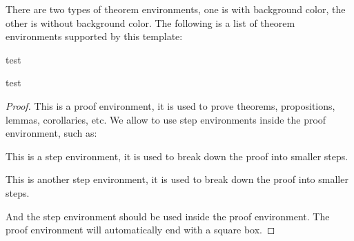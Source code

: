     There are two types of theorem environments, one is with background color, the other is without background color. 
    The following is a list of theorem environments supported by this template:

    \begin{definition}
        test    
    \end{definition}
    \begin{proposition}
        test 
    \end{proposition}
    \begin{proof}
        This is a proof environment, it is used to prove theorems, propositions, lemmas, corollaries, etc.
        We allow to use step environments inside the proof environment, such as:
        \begin{step}\label{step:1_in_proof_1}
            This is a step environment, it is used to break down the proof into smaller steps.
        \end{step}
        \begin{step}\label{step:2_in_proof_1}
            This is another step environment, it is used to break down the proof into smaller steps.
        \end{step}
        And the step environment should be used inside the proof environment.
        The proof environment will automatically end with a square box.
    \end{proof}
    
